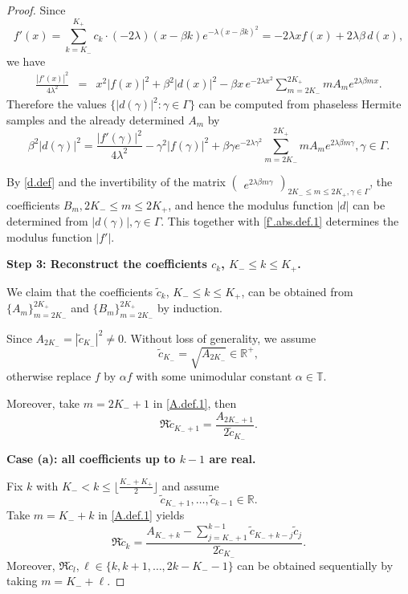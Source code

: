 \documentclass[11pt,oneside,reqno]{amsart}
\numberwithin{equation}{section}
\def\R{ {\mathbb R} }
\def\T{ {\mathbb T} }
\begin{document}
\begin{proof}
Since
\[
f'(x)=\sum_{k=K_-}^{K_+} c_k\cdot (-2\lambda)(x-\beta k)e^{-\lambda(x-\beta k)^2}
= -2\lambda x f(x)+2\lambda\beta\, d(x),
\]
we have
\begin{eqnarray}\label{f'.abs.def.1}
\frac{|f'(x)|^2}{4\lambda^2}
&=&
x^2|f(x)|^2+\beta^2|d(x)|^2-\beta x\,e^{-2\lambda x^2}\sum_{m=2K_-}^{2K_+}mA_m e^{2\lambda\beta m x}.
\end{eqnarray}
Therefore the values $\{|d(\gamma)|^2:\gamma\in\Gamma\}$ can be computed from phaseless Hermite samples and the already determined $A_m$ by
\begin{equation}\label{d.samples}
\beta^2|d(\gamma)|^2
=
\frac{|f'(\gamma)|^2}{4\lambda^2}-\gamma^2|f(\gamma)|^2
+\beta \gamma e^{-2\lambda\gamma^2}\sum_{m=2K_-}^{2K_+}mA_m e^{2\lambda\beta m\gamma},
\gamma\in\Gamma.
\end{equation}

By \eqref{d.def} and  the invertibility of the matrix $\begin{pmatrix}e^{2\lambda\beta m\gamma}\end{pmatrix}_{2K_-\le m\le 2K_+, \gamma \in \Gamma}$, the coefficients $B_m, 2K_-\le m\le 2K_+$, and hence the modulus function $|d|$ can be determined from  $|d(\gamma)|, \gamma\in\Gamma$. 
This together with \eqref{f'.abs.def.1} determines the modulus function $|f'|$.

\smallskip
\medskip
\noindent\textbf{Step 3: Reconstruct the coefficients $c_k$, $K_-\le k\le K_+$.}
\smallskip

We claim that the coefficients $\tilde c_k$, $K_-\le k\le K_+$, can be obtained from $\{A_m\}_{m=2K_-}^{2K_+}$ and $ \{B_m\}_{m=2K_-}^{2K_+}$ by induction.

Since $A_{2K_-}=|\tilde c_{K_-}|^2\neq 0$. Without loss of generality, we assume
\begin{equation}\label{c_0.def.1}
\tilde c_{K_-}=\sqrt{A_{2K_-}}\in \R^+,
\end{equation}
otherwise replace $f$ by $\alpha f$ with some unimodular constant $\alpha\in\T$.

Moreover, take $m=2K_-+1$ in \eqref{A.def.1}, then 
\begin{equation}\label{S3:ReK-1}
\Re\tilde c_{K_-+1}=\frac{A_{2K_-+1}}{2\tilde c_{K_-}}.
\end{equation}

\medskip
\noindent\textbf{Case (a): all coefficients up to $k-1$ are real.}

Fix $k$ with $K_-<k\le \lfloor\frac{K_-+K_+}{2}\rfloor$ and assume
\[
\tilde c_{K_-+1},\ldots,\tilde c_{k-1}\in\R.
\]
Take $m=K_-+k$ in \eqref{A.def.1} yields
\begin{equation}\label{S3:Rek-a}
\Re\tilde c_k=
\frac{A_{K_-+k}-\sum_{j=K_-+1}^{k-1}\tilde c_{K_-+k-j}\tilde c_j}
     {2\tilde c_{K_-}}.
\end{equation}
Moreover,  $\Re\tilde c_{l}, \ell\in \{k,k+1,\ldots,2k-K_--1\}$ can be obtained sequentially by taking  $m=K_-+\ell$. 


\end{proof}
\end{document}
